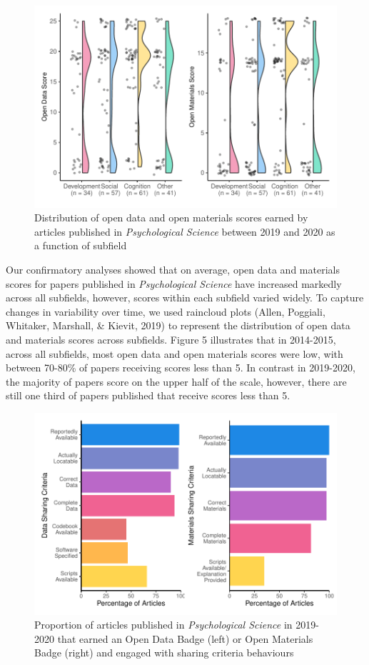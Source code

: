 \documentclass[
  english,
  man,floatsintext]{apa6}
\begin{document}
\begin{figure}
\centering
\includegraphics{icd_special_issue_files/figure-latex/rain-1.pdf}
\caption{\label{fig:rain}Distribution of open data and open materials scores earned by articles published in \emph{Psychological Science} between 2019 and 2020 as a function of subfield}
\end{figure}

Our confirmatory analyses showed that on average, open data and materials scores for papers published in \emph{Psychological Science} have increased markedly across all subfields, however, scores within each subfield varied widely. To capture changes in variability over time, we used raincloud plots (Allen, Poggiali, Whitaker, Marshall, \& Kievit, 2019) to represent the distribution of open data and materials scores across subfields. Figure 5 illustrates that in 2014-2015, across all subfields, most open data and open materials scores were low, with between 70-80\% of papers receiving scores less than 5. In contrast in 2019-2020, the majority of papers score on the upper half of the scale, however, there are still one third of papers published that receive scores less than 5.

\begin{figure}
\centering
\includegraphics{icd_special_issue_files/figure-latex/unnamed-chunk-6-1.pdf}
\caption{\label{fig:unnamed-chunk-6}Proportion of articles published in \emph{Psychological Science} in 2019-2020 that earned an Open Data Badge (left) or Open Materials Badge (right) and engaged with sharing criteria behaviours}
\end{figure}
\end{document}
